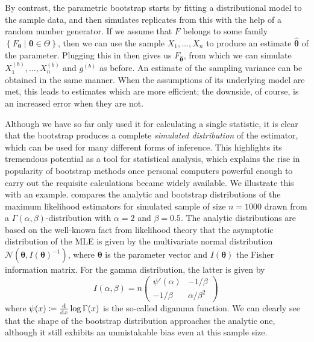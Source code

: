 \documentclass[a4paper]{book}
\begin{document}
By contrast, the parametric bootstrap starts by fitting a distributional model to the sample data, and then simulates replicates from this with the help of a random number generator. If we assume that $F$ belongs to some family $\left \{ F_{\bm{\theta}} \mid  \bm{\theta} \in \Theta \right \}$, then we can use the sample $X_1, \dots, X_n$ to produce an estimate $\bm{\widehat{\theta}}$ of the parameter. Plugging this in then gives us $F_{\bm{\widehat{\theta}}}$, from which we can simulate $X^{(b)}_1, \dots , X^{(b)}_n$ and $g^{(b)}$ as before. An estimate of the sampling variance can be obtained in the same manner. When the assumptions of its underlying model are met, this leads to estimates which are more efficient; the downside, of course, is an increased error when they are not.

Although we have so far only used it for calculating a single statistic, it is clear that the bootstrap produces a complete \emph{simulated distribution} of the estimator, which can be used for many different forms of inference. This highlights its tremendous potential as a tool for statistical analysis, which explains the rise in popularity of bootstrap methods once personal computers powerful enough to carry out the requisite calculations became widely available. We illustrate this with an example.  compares the analytic and bootstrap distributions of the maximum likelihood estimators for simulated sample of size $n = 1000$ drawn from a $\Gamma(\alpha, \beta)$-distribution with $\alpha = 2$ and $\beta = 0.5$. The analytic distributions are based on the well-known fact from likelihood theory that the asymptotic distribution of the MLE is given by the multivariate normal distribution $\mathcal{N}(\bm{\theta}, I(\bm{\theta})^{-1})$, where $\bm{\theta}$ is the parameter vector and $I(\bm{\theta})$ the Fisher information matrix. For the gamma distribution, the latter is given by
\begin{equation}
  I(\alpha, \beta) = n
  \begin{pmatrix}
    \psi'(\alpha) & -1 / \beta       \\
    -1 / \beta    & \alpha / \beta^2
  \end{pmatrix} \,
\end{equation}
where $\psi(x) \coloneqq \odv{}{x} \log \Gamma(x)$ is the so-called digamma function. We can clearly see that the shape of the bootstrap distribution approaches the analytic one, although it still exhibits an unmistakable bias even at this sample size.
\end{document}

